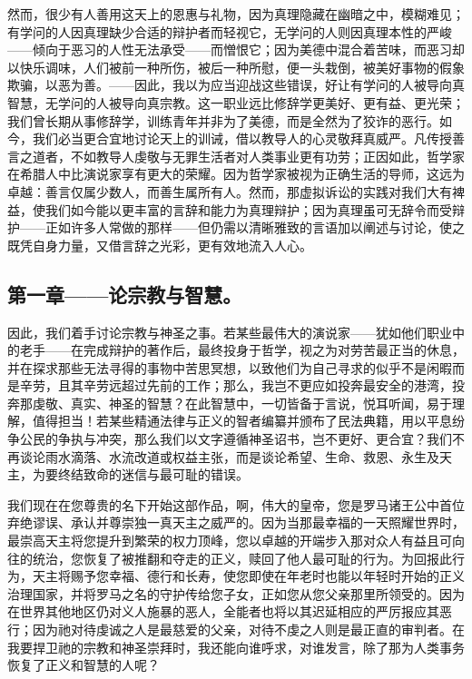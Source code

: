 然而，很少有人善用这天上的恩惠与礼物，因为真理隐藏在幽暗之中，模糊难见；有学问的人因真理缺少合适的辩护者而轻视它，无学问的人则因真理本性的严峻——倾向于恶习的人性无法承受——而憎恨它；因为美德中混合着苦味，而恶习却以快乐调味，人们被前一种所伤，被后一种所慰，便一头栽倒，被美好事物的假象欺骗，以恶为善。——因此，我以为应当迎战这些错误，好让有学问的人被导向真智慧，无学问的人被导向真宗教。这一职业远比修辞学更美好、更有益、更光荣；我们曾长期从事修辞学，训练青年并非为了美德，而是全然为了狡诈的恶行。如今，我们必当更合宜地讨论天上的训诫，借以教导人的心灵敬拜真威严。凡传授善言之道者，不如教导人虔敬与无罪生活者对人类事业更有功劳；正因如此，哲学家在希腊人中比演说家享有更大的荣耀。因为哲学家被视为正确生活的导师，这远为卓越：善言仅属少数人，而善生属所有人。然而，那虚拟诉讼的实践对我们大有裨益，使我们如今能以更丰富的言辞和能力为真理辩护；因为真理虽可无辞令而受辩护——正如许多人常做的那样——但仍需以清晰雅致的言语加以阐述与讨论，使之既凭自身力量，又借言辞之光彩，更有效地流入人心。\par


\subsection{第一章——论宗教与智慧。}

因此，我们着手讨论宗教与神圣之事。若某些最伟大的演说家——犹如他们职业中的老手——在完成辩护的著作后，最终投身于哲学，视之为对劳苦最正当的休息，并在探求那些无法寻得的事物中苦思冥想，以致他们为自己寻求的似乎不是闲暇而是辛劳，且其辛劳远超过先前的工作；那么，我岂不更应如投奔最安全的港湾，投奔那虔敬、真实、神圣的智慧？在此智慧中，一切皆备于言说，悦耳听闻，易于理解，值得担当！若某些精通法律与正义的智者编纂并颁布了民法典籍，用以平息纷争公民的争执与冲突，那么我们以文字遵循神圣诏书，岂不更好、更合宜？我们不再谈论雨水滴落、水流改道或权益主张，而是谈论希望、生命、救恩、永生及天主，为要终结致命的迷信与最可耻的错误。\par

我们现在在您尊贵的名下开始这部作品，啊，伟大的皇帝，您是罗马诸王公中首位弃绝谬误、承认并尊崇独一真天主之威严的。因为当那最幸福的一天照耀世界时，最崇高天主将您提升到繁荣的权力顶峰，您以卓越的开端步入那对众人有益且可向往的统治，您恢复了被推翻和夺走的正义，赎回了他人最可耻的行为。为回报此行为，天主将赐予您幸福、德行和长寿，使您即使在年老时也能以年轻时开始的正义治理国家，并将罗马之名的守护传给您子女，正如您从您父亲那里所领受的。因为在世界其他地区仍对义人施暴的恶人，全能者也将以其迟延相应的严厉报应其恶行；因为祂对待虔诚之人是最慈爱的父亲，对待不虔之人则是最正直的审判者。在我要捍卫祂的宗教和神圣崇拜时，我还能向谁呼求，对谁发言，除了那为人类事务恢复了正义和智慧的人呢？\par

